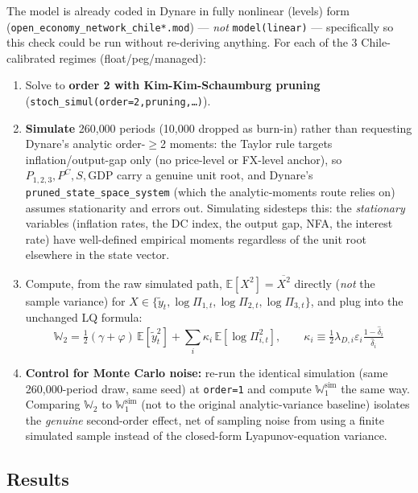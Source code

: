 \documentclass[12pt]{article}
\begin{document}
The model is already coded in Dynare in fully nonlinear (levels) form (\texttt{open\_economy\_network\_chile*.mod}) --- \emph{not} \texttt{model(linear)} --- specifically so this check could be run without re-deriving anything. For each of the 3 Chile-calibrated regimes (float/peg/managed):
\begin{enumerate}
    \item Solve to \textbf{order 2 with Kim-Kim-Schaumburg pruning} (\texttt{stoch\_simul(order=2,pruning,\ldots)}).
    \item \textbf{Simulate} 260{,}000 periods (10{,}000 dropped as burn-in) rather than requesting Dynare's analytic order-$\geq$2 moments: the Taylor rule targets inflation/output-gap only (no price-level or FX-level anchor), so $P_{1,2,3}, P^C, S, \mathrm{GDP}$ carry a genuine unit root, and Dynare's \texttt{pruned\_state\_space\_system} (which the analytic-moments route relies on) assumes stationarity and errors out. Simulating sidesteps this: the \emph{stationary} variables (inflation rates, the DC index, the output gap, NFA, the interest rate) have well-defined empirical moments regardless of the unit root elsewhere in the state vector.
    \item Compute, from the raw simulated path, $\mathbb{E}[X^2]=\overline{X^2}$ directly (\emph{not} the sample variance) for $X\in\{\tilde{y}_t, \log\Pi_{1,t},\log\Pi_{2,t},\log\Pi_{3,t}\}$, and plug into the unchanged LQ formula:
    \begin{equation}
        \mathbb{W}_2 = \tfrac{1}{2}(\gamma+\varphi)\,\mathbb{E}[\tilde{y}_t^2] + \sum_i \kappa_i\,\mathbb{E}[\log\Pi_{i,t}^2], \qquad \kappa_i \equiv \tfrac{1}{2}\lambda_{D,i}\varepsilon_i\tfrac{1-\hat\delta_i}{\hat\delta_i}
    \end{equation}
    \item \textbf{Control for Monte Carlo noise:} re-run the identical simulation (same 260{,}000-period draw, same seed) at \texttt{order=1} and compute $\mathbb{W}_1^{\mathrm{sim}}$ the same way. Comparing $\mathbb{W}_2$ to $\mathbb{W}_1^{\mathrm{sim}}$ (not to the original analytic-variance baseline) isolates the \emph{genuine} second-order effect, net of sampling noise from using a finite simulated sample instead of the closed-form Lyapunov-equation variance.
\end{enumerate}

\subsection{Results}
\end{document}
